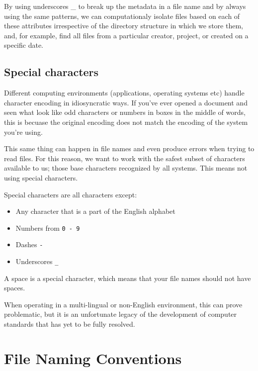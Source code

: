 \documentclass[
]{book}
\providecommand{\tightlist}{%
  \setlength{\itemsep}{0pt}\setlength{\parskip}{0pt}}
\begin{document}
By using underscores \_ to break up the metadata in a file name and by always using the same patterns, we can computationaly isolate files based on each of these attributes irrespective of the directory structure in which we store them, and, for example, find all files from a particular creator, project, or created on a specific date.

\hypertarget{special-characters}{%
\subsection*{Special characters}\label{special-characters}}

Different computing environments (applications, operating systems etc) handle character encoding in idiosyncratic ways. If you've ever opened a document and seen what look like odd characters or numbers in boxes in the middle of words, this is becuase the original encoding does not match the encoding of the system you're using.

This same thing can happen in file names and even produce errors when trying to read files. For this reason, we want to work with the safest subset of characters available to us; those base characters recognized by all systems. This means not using special characters.

Special characters are all characters except:

\begin{itemize}
\tightlist
\item
  Any character that is a part of the English alphabet
\item
  Numbers from \texttt{0\ -\ 9}
\item
  Dashes \texttt{-}
\item
  Underscores \texttt{\_}
\end{itemize}

A space is a special character, which means that your file names should not have spaces.

When operating in a multi-lingual or non-English environment, this can prove problematic, but it is an unfortunate legacy of the development of computer standards that has yet to be fully resolved.

\hypertarget{file-naming-conventions}{%
\section*{File Naming Conventions}\label{file-naming-conventions}}
\end{document}
